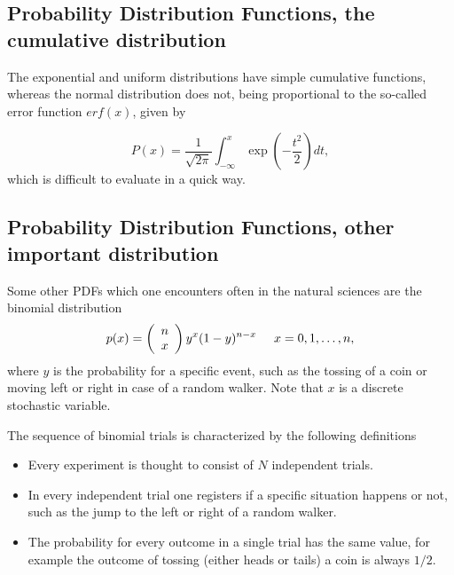 \documentclass[%
oneside,                 %
final,                   %
10pt]{article}
\newenvironment{block_mdfboxadmon}[1][]{
\begin{block_mdfboxmdframed}[frametitle=#1]
}
{
\end{block_mdfboxmdframed}
}
\begin{document}
\subsection{Probability Distribution Functions, the cumulative distribution}

\begin{block_mdfboxadmon}[]

The exponential and uniform distributions have simple cumulative functions,
whereas the normal distribution does not, being proportional to the so-called
error function $erf(x)$, given by

\begin{equation*} 
P(x) = \frac{1}{\sqrt{2\pi}}\int_{-\infty}^x\exp{\left(-\frac{t^2}{2}\right)}dt,
\end{equation*}
which is difficult to evaluate in a quick way.
\end{block_mdfboxadmon} %




\subsection{Probability Distribution Functions, other important distribution}

\begin{block_mdfboxadmon}[]

Some other PDFs which one encounters often in the natural sciences are the binomial distribution
\begin{equation*}
   p(x) = \left(\begin{array}{c} n \\ x\end{array}\right)y^x(1-y)^{n-x} \hspace{0.5cm}x=0,1,\dots,n,
\end{equation*}
where $y$ is the probability for a specific event, such as the tossing of a coin or moving left or right
in case of a random walker. Note that $x$ is a discrete stochastic variable. 

The sequence of binomial trials is characterized by the following definitions

\begin{itemize}
  \item Every experiment is thought to consist of $N$ independent trials.

  \item In every independent trial one registers if a specific situation happens or not, such as the  jump to the left or right of a random walker.

  \item The probability for every outcome in a single trial has the same value, for example the outcome of tossing (either heads or tails) a coin is always $1/2$.
\end{itemize}

\noindent
\end{block_mdfboxadmon} %
\end{document}
